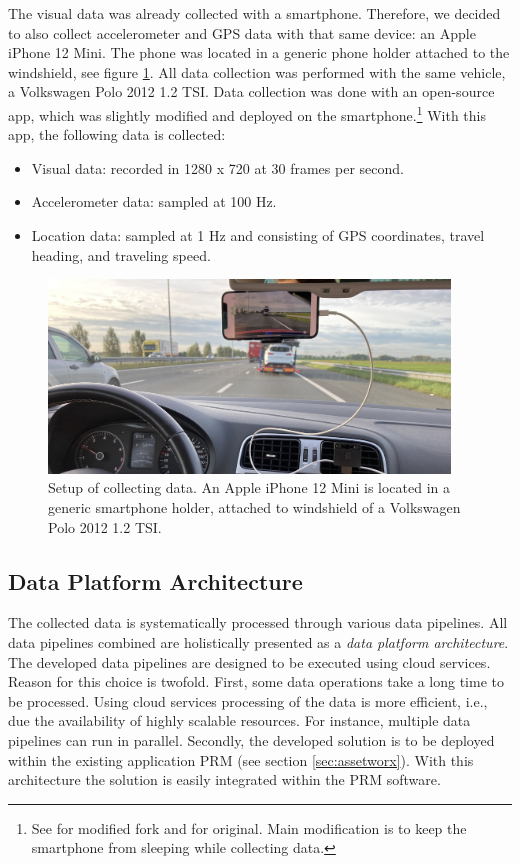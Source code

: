 The visual data was already collected with a smartphone. Therefore, we decided to also collect accelerometer and GPS data with that same device: an Apple iPhone 12 Mini. The phone was located in a generic phone holder attached to the windshield, see figure \ref{fig:smartphone-collector}. All data collection was performed with the same vehicle, a Volkswagen Polo 2012 1.2 TSI. Data collection was done with an open-source app, which was slightly modified and deployed on the smartphone.\footnote{See \cite{ios_logger} for modified fork and \cite{ios_logger_original} for original. Main modification is to keep the smartphone from sleeping while collecting data.} With this app, the following data is collected:
\begin{itemize}
\item Visual data: recorded in 1280 x 720 at 30 frames per second.
\item Accelerometer data: sampled at 100 Hz.
\item Location data: sampled at 1 Hz and consisting of GPS coordinates, travel heading, and traveling speed.
\end{itemize}


\begin{figure}[H]
\begin{center}
\includegraphics[width=0.95\textwidth,keepaspectratio]{images/4_data/smartphone-setup.jpg}
\end{center}
\captionsetup{width=.90\textwidth}
\caption{Setup of collecting data. An Apple iPhone 12 Mini is located in a generic smartphone holder, attached to windshield of a Volkswagen Polo 2012 1.2 TSI.}
\label{fig:smartphone-collector}
\end{figure}


\subsection{Data Platform Architecture}
The collected data is systematically processed through various data pipelines. All data pipelines combined are holistically presented as a \textit{data platform architecture}. The developed data pipelines are designed to be executed using cloud services. Reason for this choice is twofold. First, some data operations take a long time to be processed. Using cloud services processing of the data is more efficient, i.e., due the availability of highly scalable resources. For instance, multiple data pipelines can run in parallel. Secondly, the developed solution is to be deployed within the existing application PRM (see section \ref{sec:assetworx}). With this architecture the solution is easily integrated within the PRM software.

